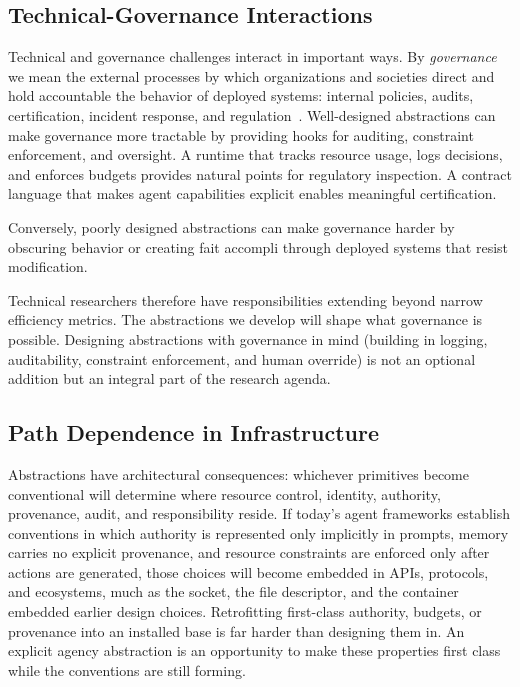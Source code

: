 \documentclass[11pt]{article}
\begin{document}
\subsection{Technical-Governance Interactions}

Technical and governance challenges interact in important ways. By \textit{governance} we mean the external processes by which organizations and societies direct and hold accountable the behavior of deployed systems: internal policies, audits, certification, incident response, and regulation~\cite{shavit_governing,kolt_governing}. Well-designed abstractions can make governance more tractable by providing hooks for auditing, constraint enforcement, and oversight. A runtime that tracks resource usage, logs decisions, and enforces budgets provides natural points for regulatory inspection. A contract language that makes agent capabilities explicit enables meaningful certification.

Conversely, poorly designed abstractions can make governance harder by obscuring behavior or creating fait accompli through deployed systems that resist modification.

Technical researchers therefore have responsibilities extending beyond narrow efficiency metrics. The abstractions we develop will shape what governance is possible. Designing abstractions with governance in mind (building in logging, auditability, constraint enforcement, and human override) is not an optional addition but an integral part of the research agenda.

\subsection{Path Dependence in Infrastructure}

Abstractions have architectural consequences: whichever primitives become conventional will determine where resource control, identity, authority, provenance, audit, and responsibility reside. If today's agent frameworks establish conventions in which authority is represented only implicitly in prompts, memory carries no explicit provenance, and resource constraints are enforced only after actions are generated, those choices will become embedded in APIs, protocols, and ecosystems, much as the socket, the file descriptor, and the container embedded earlier design choices. Retrofitting first-class authority, budgets, or provenance into an installed base is far harder than designing them in. An explicit agency abstraction is an opportunity to make these properties first class while the conventions are still forming.
\end{document}
